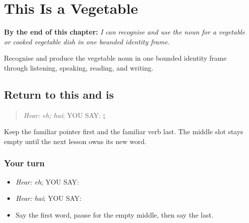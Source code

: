 
\chapter{This Is a Vegetable}
\label{ch:pa-a2-sabzi}

\begin{chapteropening}
\textbf{By the end of this chapter:} \emph{I can recognise and use the noun for a vegetable or cooked vegetable dish in one bounded identity frame.}

Recognise and produce the vegetable noun in one bounded identity frame through listening, speaking, reading, and writing.
\end{chapteropening}

\section[\texorpdfstring{\pa{ਇਹ} · \pa{ਹੈ} (eh; hai)}{ਇਹ · ਹੈ (eh; hai)}]{Return to this and is}

\label{lesson:PA-C200-vegetable-return}



\begin{quote}
\emph{Hear:} \emph{eh; hai}; YOU SAY: \textbf{; }
\end{quote}

\begin{grammarlens}[title={Grammar Lens}]
Keep the familiar pointer first and the familiar verb last. The middle slot stays empty until the next lesson owns its new word.
\end{grammarlens}

\subsection*{Your turn}
\begin{itemize}
\raggedright
  \item \emph{Hear:} \emph{eh}; YOU SAY: \textbf{}
  \item \emph{Hear:} \emph{hai}; YOU SAY: \textbf{}
  \item Say the first word, pause for the empty middle, then say the last.
\end{itemize}

